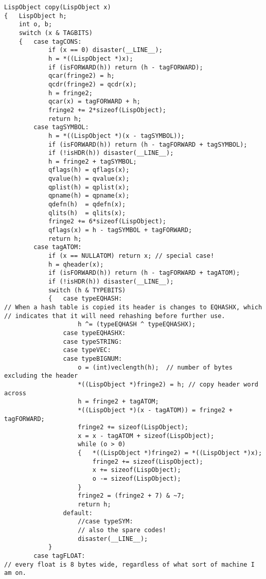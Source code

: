 {\begin{verbatim}
LispObject copy(LispObject x)
{   LispObject h;
    int o, b;
    switch (x & TAGBITS)
    {   case tagCONS:
            if (x == 0) disaster(__LINE__);
            h = *((LispObject *)x);
            if (isFORWARD(h)) return (h - tagFORWARD);
            qcar(fringe2) = h;
            qcdr(fringe2) = qcdr(x);
            h = fringe2;
            qcar(x) = tagFORWARD + h;
            fringe2 += 2*sizeof(LispObject);
            return h;
        case tagSYMBOL:
            h = *((LispObject *)(x - tagSYMBOL));
            if (isFORWARD(h)) return (h - tagFORWARD + tagSYMBOL);
            if (!isHDR(h)) disaster(__LINE__);
            h = fringe2 + tagSYMBOL;
            qflags(h) = qflags(x);
            qvalue(h) = qvalue(x);
            qplist(h) = qplist(x);
            qpname(h) = qpname(x);
            qdefn(h)  = qdefn(x);
            qlits(h)  = qlits(x);
            fringe2 += 6*sizeof(LispObject);
            qflags(x) = h - tagSYMBOL + tagFORWARD;
            return h;
        case tagATOM:
            if (x == NULLATOM) return x; // special case!
            h = qheader(x);
            if (isFORWARD(h)) return (h - tagFORWARD + tagATOM);
            if (!isHDR(h)) disaster(__LINE__);
            switch (h & TYPEBITS)
            {   case typeEQHASH:
// When a hash table is copied its header is changes to EQHASHX, which
// indicates that it will need rehashing before further use.
                    h ^= (typeEQHASH ^ typeEQHASHX);
                case typeEQHASHX:
                case typeSTRING:
                case typeVEC:
                case typeBIGNUM:
                    o = (int)veclength(h);  // number of bytes excluding the header
                    *((LispObject *)fringe2) = h; // copy header word across
                    h = fringe2 + tagATOM;
                    *((LispObject *)(x - tagATOM)) = fringe2 + tagFORWARD;
                    fringe2 += sizeof(LispObject);
                    x = x - tagATOM + sizeof(LispObject);
                    while (o > 0)
                    {   *((LispObject *)fringe2) = *((LispObject *)x);
                        fringe2 += sizeof(LispObject);
                        x += sizeof(LispObject);
                        o -= sizeof(LispObject);
                    }
                    fringe2 = (fringe2 + 7) & ~7;
                    return h;
                default:
                    //case typeSYM:
                    // also the spare codes!
                    disaster(__LINE__);
            }
        case tagFLOAT:
// every float is 8 bytes wide, regardless of what sort of machine I am on.

\end{verbatim}}
